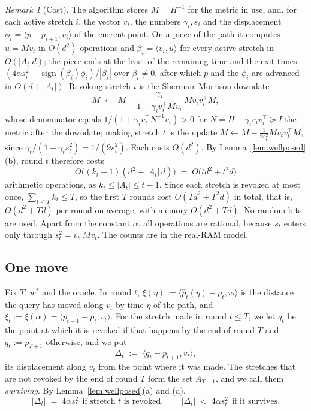 \documentclass[11pt]{article}
\theoremstyle{plain}
\theoremstyle{definition}
\theoremstyle{remark}
\newtheorem{remark}[theorem]{Remark}
\newcommand{\wstar}{w^{\ast}}
\newcommand{\ip}[2]{\langle #1, #2\rangle}
\begin{document}
\begin{remark}[Cost]\label{rem:cost}
The algorithm stores $M=H^{-1}$ for the metric in use, and, for each active stretch $i$, the
vector $v_i$, the numbers $\gamma_i,s_i$ and the displacement $\phi_i=\ip{p-p_{i+1}}{v_i}$ of the
current point. On a piece of the path it computes $u=Mv_t$ in $O(d^{2})$ operations and
$\beta_i=\ip{v_i}{u}$ for every active stretch in $O(|A_t|d)$; the piece ends at the least of the
remaining time and the exit times $(4\alpha s_i^{2}-\operatorname{sign}(\beta_i)\phi_i)/|\beta_i|$
over $\beta_i\neq0$, after which $p$ and the $\phi_i$ are advanced in $O(d+|A_t|)$. Revoking
stretch $i$ is the Sherman--Morrison downdate
\[
  M\;\leftarrow\;M+\frac{\gamma_i}{1-\gamma_iv_i^{\top}Mv_i}\,Mv_iv_i^{\top}M ,
\]
whose denominator equals $1/(1+\gamma_iv_i^{\top}N^{-1}v_i)>0$ for $N=H-\gamma_iv_iv_i^{\top}\succeq
I$ the metric after the downdate; making stretch $t$ is the update
$M\leftarrow M-\tfrac{1}{9s_t^{2}}Mv_tv_t^{\top}M$, since $\gamma_t/(1+\gamma_ts_t^{2})=1/(9s_t^{2})$.
Each costs $O(d^{2})$. By Lemma~\ref{lem:wellposed}(b), round $t$ therefore costs
\[
  O\bigl((k_t+1)(d^{2}+|A_t|\,d)\bigr)\;=\;O\bigl(td^{2}+t^{2}d\bigr)
\]
arithmetic operations, as $k_t\le|A_t|\le t-1$. Since each stretch is revoked at most once,
$\sum_{t\le T}k_t\le T$, so the first $T$ rounds cost $O(Td^{2}+T^{2}d)$ in total, that is,
$O(d^{2}+Td)$ per round on average, with memory $O(d^{2}+Td)$. No random bits are used. Apart from
the constant $\alpha$, all operations are rational, because $s_t$ enters only through
$s_t^{2}=v_t^{\top}Mv_t$. The counts are in the real-RAM model.
\end{remark}

\subsection{One move}\label{sec:move}

Fix $T$, $\wstar$ and the oracle. In round $t$, $\xi(\eta):=\ip{\hat p_t(\eta)-p_t}{v_t}$ is the
distance the query has moved along $v_t$ by time $\eta$ of the path, and
$\xi_t:=\xi(\alpha)=\ip{p_{t+1}-p_t}{v_t}$. For the stretch made in round $t\le T$, we let $q_t$ be
the point at which it is revoked if that happens by the end of round $T$ and $q_t:=p_{T+1}$
otherwise, and we put
\[
  \Delta_t\;:=\;\ip{q_t-p_{t+1}}{v_t} ,
\]
its displacement along $v_t$ from the point where it was made. The stretches that are not revoked by
the end of round $T$ form the set $A_{T+1}$, and we call them \emph{surviving}. By
Lemma~\ref{lem:wellposed}(a) and (d),
\begin{equation}\label{eq:delta}
  |\Delta_t|\;=\;4\alpha s_t^{2}\ \ \text{if stretch $t$ is revoked},\qquad
  |\Delta_t|\;<\;4\alpha s_t^{2}\ \ \text{if it survives} .
\end{equation}
\end{document}
